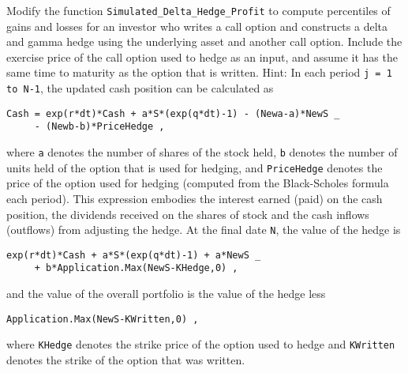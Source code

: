 \begin{prob}
\end{prob}\begin{prob} Modify the function \verb!Simulated_Delta_Hedge_Profit! to compute percentiles of gains and losses for an investor who writes a call option and constructs a delta and gamma hedge using the underlying asset and another call option. Include the exercise price of the call option used to hedge as an input, and assume it has the same time to maturity as the option that is written.  Hint:  In each period \verb!j = 1 to N-1!, the updated cash position can be calculated as
\small\begin{verbatim}
Cash = exp(r*dt)*Cash + a*S*(exp(q*dt)-1) - (Newa-a)*NewS _
     - (Newb-b)*PriceHedge ,
\end{verbatim}\normalsize
where \verb!a! denotes the number of shares of the stock held, \verb!b! denotes the number of units held of the option that is used for hedging, and \verb!PriceHedge! denotes the price of the option used for hedging (computed from the Black-Scholes formula each period).  This expression embodies the interest earned (paid) on the cash position, the dividends received on the shares of stock and the cash inflows (outflows) from adjusting the hedge.  At the final date \verb!N!, the value of the hedge is
\small\begin{verbatim}
exp(r*dt)*Cash + a*S*(exp(q*dt)-1) + a*NewS _
     + b*Application.Max(NewS-KHedge,0) ,
 \end{verbatim}\normalsize
 and the value of the overall portfolio is the value of the hedge less
 \small\begin{verbatim}
Application.Max(NewS-KWritten,0) ,
 \end{verbatim}\normalsize
where \verb!KHedge! denotes the strike price of the option used to hedge and \verb!KWritten! denotes the strike of the option that was written.
\end{prob}
